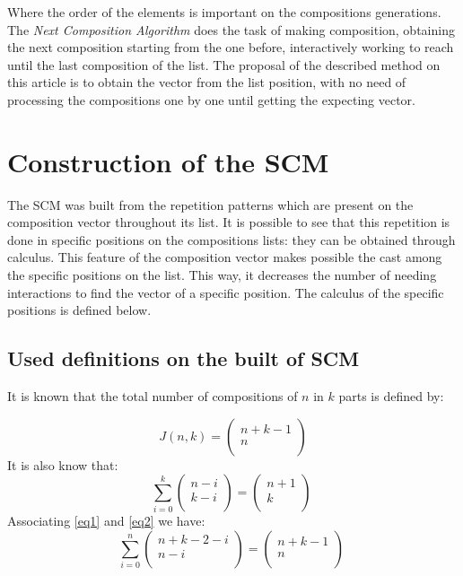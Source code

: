 \documentclass{amsart}
\begin{document}
Where the order of the elements is important on the compositions generations. The \emph{Next Composition Algorithm} \cite{wi} does the task of making composition, obtaining the next composition starting from the one before, interactively working to reach until the last composition of the list. The proposal of the described method on this article is to obtain the vector from the list position, with no need of processing the compositions one by one until getting the expecting vector. 

\section*{Construction of the SCM}

The SCM was built from the repetition patterns which are present on the composition vector throughout its list. It is possible to see that this repetition is done in specific positions on the compositions lists: they can be obtained through calculus. This feature of the composition vector makes possible the cast among the specific positions on the list. This way, it decreases the number of needing interactions to find the vector of a specific position. The calculus of the specific positions is defined below.

\subsection*{Used definitions on the built of SCM}
It is known that the total number of compositions of {$n$} in {$k$} parts is defined by:

\begin{equation} \label{eq1}
J(n,k) = \left(
\begin{array}{ccc}
n + k -1 \\
n\\
\end{array} \right)
\end{equation}
It is also know that:
\begin{equation} \label{eq2}
\sum_{i=0}^{k} \left(
\begin{array}{ccc}
n - i \\
k - i \\
\end{array} \right) =
\left(
\begin{array}{ccc}
n + 1 \\
k\\
\end{array} \right) \;
\end{equation}
Associating \ref{eq1} and \ref{eq2} we have:
\begin{equation} \label{eq3}
\sum_{i=0}^{n} \left(
\begin{array}{ccc}
n + k - 2 - i \\
n - i \\
\end{array} \right) =
\left(
\begin{array}{ccc}
n + k -1 \\
n\\
\end{array} \right) \;
\end{equation}
\end{document}

